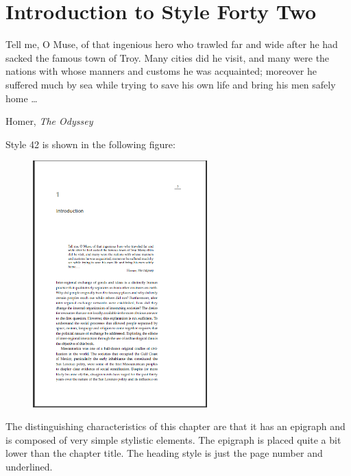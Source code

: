 
\chapter{Introduction to Style Forty Two}

\epigraph{Tell me, O Muse, of that ingenious hero who trawled far and wide after he had
sacked the famous town of Troy. Many cities did he visit, and many were the nations with whose manners
and customs he was acquainted; moreover he suffered much by sea while trying to save his own life and bring
his men safely home \ldots }{Homer, \textit{The Odyssey}}

Style 42 is shown in the following figure:

\begin{figure}[ht]
\centering
\includegraphics[width=0.6\textwidth]{./chapters/chapter42}
\end{figure}
The distinguishing characteristics of this chapter are that it has an epigraph and is composed of very simple stylistic elements. The epigraph is placed quite a bit lower than the chapter title. The heading style is just the page number and underlined.



